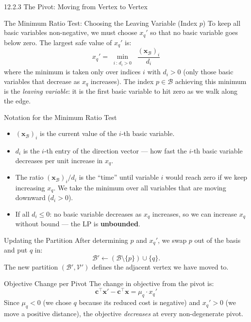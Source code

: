 \documentclass[aspectratio=169,10pt]{beamer}
\newcommand{\xv}{\mathbf{x}}
\newcommand{\cv}{\mathbf{c}}
\newcommand{\calB}{\mathcal{B}}
\newcommand{\calV}{\mathcal{V}}
\begin{document}
\begin{frame}[allowframebreaks]{12.2.3 The Pivot: Moving from Vertex to Vertex}
\framebreak

\begin{block}{The Minimum Ratio Test: Choosing the Leaving Variable (Index $p$)}
To keep all basic variables non-negative, we must choose $x_q'$ so that no basic
variable goes below zero.  The largest safe value of $x_q'$ is:
\[
  x_q' = \min_{\substack{i \,:\, d_i > 0}}\;\frac{(\xv_\calB)_i}{d_i}
\]
where the minimum is taken only over indices $i$ with $d_i > 0$ (only those
basic variables that decrease as $x_q$ increases).  The index $p \in \calB$
achieving this minimum is the \emph{leaving variable}: it is the first basic
variable to hit zero as we walk along the edge.
\end{block}

\begin{block}{Notation for the Minimum Ratio Test}
\begin{itemize}
  \item $(\xv_\calB)_i$ is the current value of the $i$-th basic variable.
  \item $d_i$ is the $i$-th entry of the direction vector --- how fast the $i$-th
        basic variable decreases per unit increase in $x_q$.
  \item The ratio $(\xv_\calB)_i / d_i$ is the ``time'' until variable $i$ would
        reach zero if we keep increasing $x_q$.  We take the minimum over all
        variables that are moving downward ($d_i > 0$).
  \item If all $d_i \le 0$: no basic variable decreases as $x_q$ increases, so we
        can increase $x_q$ without bound --- the LP is \textbf{unbounded}.
\end{itemize}
\end{block}

\begin{block}{Updating the Partition}
After determining $p$ and $x_q'$, we swap $p$ out of the basis and put $q$ in:
\[
  \calB' \leftarrow (\calB \setminus \{p\}) \cup \{q\}.
\]
The new partition $(\calB', \calV')$ defines the adjacent vertex we have moved to.
\end{block}

\begin{block}{Objective Change per Pivot}
The change in objective from the pivot is:
\[
  \cv^\top\xv' - \cv^\top\xv = \mu_q \cdot x_q'
\]
Since $\mu_q < 0$ (we chose $q$ because its reduced cost is negative) and
$x_q' > 0$ (we move a positive distance), the objective \emph{decreases} at every
non-degenerate pivot.
\end{block}


\end{frame}
\end{document}
